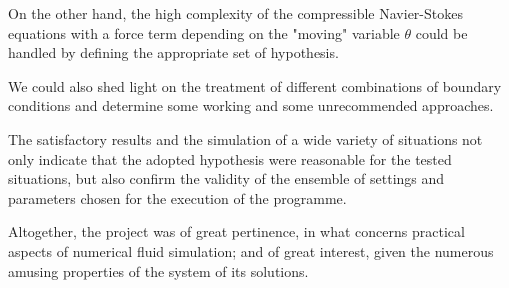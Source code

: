 \documentclass[12pt,oneside]{article}
\begin{document}
On the other hand, the high complexity of the compressible Navier-Stokes equations with a force term depending on the "moving" variable $\theta$ could be handled by defining the appropriate set of hypothesis.

We could also shed light on the treatment of different combinations of boundary conditions and determine some working and some unrecommended approaches.

The satisfactory results and the simulation of a wide variety of situations not only indicate that the adopted hypothesis were reasonable for the tested situations, but also confirm the validity of the ensemble of settings and parameters chosen for the execution of the programme.

\enlargethispage{\baselineskip}
Altogether, the project was of great pertinence, in what concerns practical aspects of numerical fluid simulation; and of great interest, given the numerous amusing properties of the system of its solutions.

\clearpage
\appendix
\end{document}
